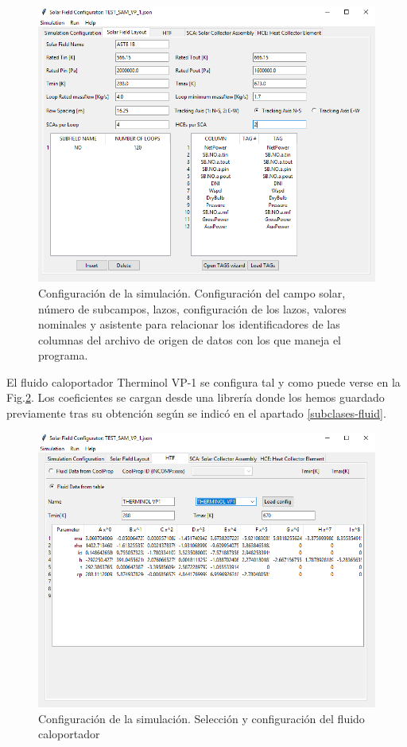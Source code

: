 \begin{figure}[!h]
\includegraphics[width=0.9\linewidth]{images/interface02.png}
\caption{Configuración de la simulación. Configuración del campo solar, número de subcampos, lazos, configuración de los lazos, valores nominales y asistente para relacionar los identificadores de las columnas del archivo de origen de datos con los que maneja el programa.} 
\label{fig:interface02}
\end{figure}

El fluido caloportador Therminol VP-1 se configura tal y como puede verse en la Fig.\ref{fig:interface03}. Los coeficientes se cargan desde una librería donde los hemos guardado previamente tras su obtención según se indicó en el apartado \ref{subclases-fluid}.

\begin{figure}[!h]
\includegraphics[width=0.9\linewidth]{images/interface03.png}
\caption{Configuración de la simulación. Selección y configuración del fluido caloportador} 
\label{fig:interface03}
\end{figure}

